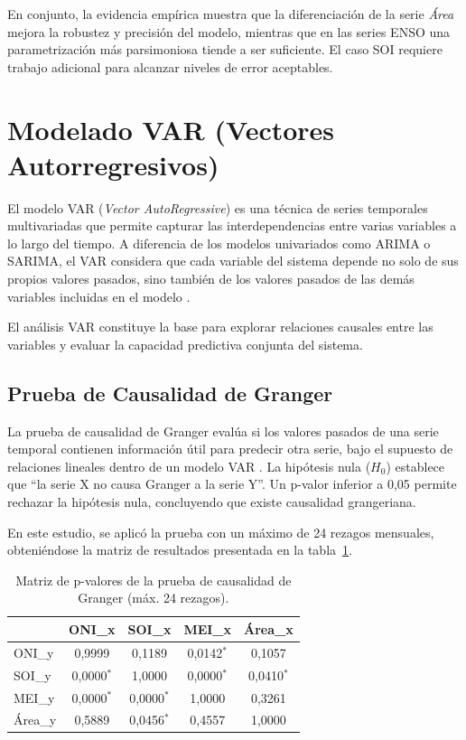 En conjunto, la evidencia empírica muestra que la diferenciación de la serie \emph{Área}
mejora la robustez y precisión del modelo, mientras que en las series ENSO una
parametrización más parsimoniosa tiende a ser suficiente. El caso SOI requiere trabajo
adicional para alcanzar niveles de error aceptables.

\section{Modelado VAR (Vectores Autorregresivos)}

El modelo VAR (\textit{Vector AutoRegressive}) es una técnica de series temporales multivariadas que permite capturar las interdependencias entre varias variables a lo largo del tiempo. A diferencia de los modelos univariados como ARIMA o SARIMA, el VAR considera que cada variable del sistema depende no solo de sus propios valores pasados, sino también de los valores pasados de las demás variables incluidas en el modelo \parencite{lutkepohl2005new}.

El análisis VAR constituye la base para explorar relaciones causales entre las variables y evaluar la capacidad predictiva conjunta del sistema.

\subsection{Prueba de Causalidad de Granger}

La prueba de causalidad de Granger evalúa si los valores pasados de una serie temporal contienen información útil para predecir otra serie, bajo el supuesto de relaciones lineales dentro de un modelo VAR \parencite{granger1969investigating}.
La hipótesis nula (\(H_0\)) establece que “la serie X no causa Granger a la serie Y”. Un p-valor inferior a 0,05 permite rechazar la hipótesis nula, concluyendo que existe causalidad grangeriana.

En este estudio, se aplicó la prueba con un máximo de 24 rezagos mensuales, obteniéndose la matriz de resultados presentada en la tabla~\ref{tab:granger_matrix}.

\begin{table}[H]
    \centering
    \caption{Matriz de p-valores de la prueba de causalidad de Granger (máx. 24 rezagos).}
    \label{tab:granger_matrix}
    \begin{tabular}{lcccc}
        \toprule
        & ONI\_x & SOI\_x & MEI\_x & Área\_x \\
        \midrule
        ONI\_y  & 0,9999   & 0,1189   & 0,0142$^{*}$ & 0,1057   \\
        SOI\_y  & 0,0000$^{*}$ & 1,0000   & 0,0000$^{*}$ & 0,0410$^{*}$ \\
        MEI\_y  & 0,0000$^{*}$ & 0,0000$^{*}$ & 1,0000   & 0,3261   \\
        Área\_y & 0,5889   & 0,0456$^{*}$ & 0,4557   & 1,0000   \\
        \bottomrule
    \end{tabular}
        
\end{table}

